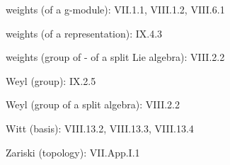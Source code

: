 weights (of a g-module): VII.1.1, VIII.1.2, VIII.6.1

weights (of a representation): IX.4.3

weights (group of - of a split Lie algebra): VIII.2.2

Weyl (group): IX.2.5

Weyl (group of a split algebra): VIII.2.2

Witt (basis): VIII.13.2, VIII.13.3, VIII.13.4

Zariski (topology): VII.App.I.1